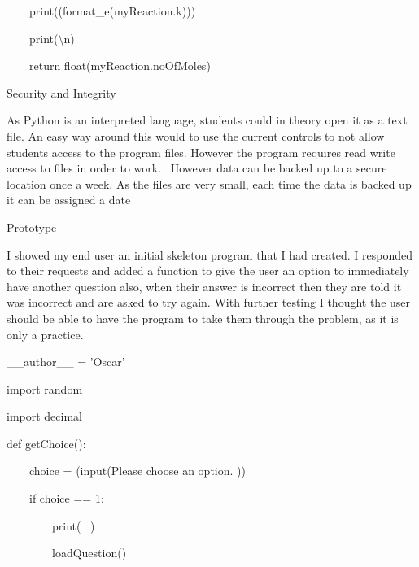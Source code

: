 \documentclass{article}
\begin{document}
\ \ \ \ print((format\_e(myReaction.k)))

\ \ \ \ print({\textquotedbl}{\textbackslash}n{\textquotedbl})

\ \ \ \ return float(myReaction.noOfMoles)


\bigskip


\bigskip


\bigskip

Security and Integrity


\bigskip

As Python is an interpreted language, students could in theory open it as a text file. An easy way around this would to use the current controls to not allow students access to the program files. However the program requires read write access to files in order to work. \ However data can be backed up to a secure location once a week. As the files are very small, each time the data is backed up it can be assigned a date


\bigskip


\bigskip


\bigskip

Prototype


\bigskip

I showed my end user an initial skeleton program that I had created. I responded to their requests and added a function to give the user an option to immediately have another question also, when their answer is incorrect then they are told it was incorrect and are asked to try again. With further testing I thought the user should be able to have the program to take them through the problem, as it is only a practice.


\bigskip


\bigskip


\bigskip

\_\_author\_\_ = 'Oscar'

import random

import decimal


\bigskip


\bigskip

def getChoice():

\ \ \ \ choice = (input({\textquotedbl}Please choose an option. {\textquotedbl}))


\bigskip

\ \ \ \ if choice == {\textquotedbl}1{\textquotedbl}:

\ \ \ \ \ \ \ \ print({\textquotedbl} \ {\textquotedbl})

\ \ \ \ \ \ \ \ loadQuestion()
\end{document}
